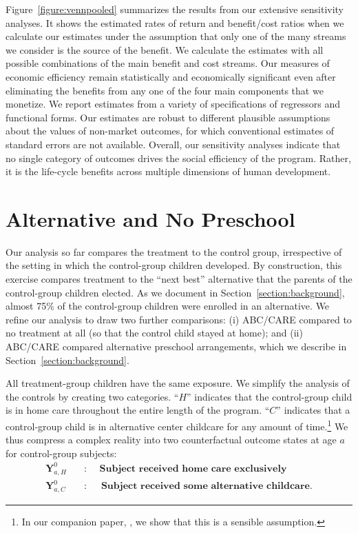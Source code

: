 Figure~\ref{figure:vennpooled} summarizes the results from our extensive sensitivity analyses. It shows the estimated rates of return and benefit/cost ratios when we calculate our estimates under the assumption that only one of the many streams we consider is the source of the benefit. We calculate the estimates with all possible combinations of the main benefit and cost streams. Our measures of economic efficiency remain statistically and economically significant even after eliminating the benefits from any one of the four main components that we monetize. We report estimates from a variety of specifications of regressors and functional forms. Our estimates are robust to different plausible assumptions about the values of non-market outcomes, for which conventional estimates of standard errors are not available. Overall, our sensitivity analyses indicate that no single category of outcomes drives the social efficiency of the program. Rather, it is the life-cycle benefits across multiple dimensions of human development.

\section{Alternative and No Preschool} \label{section:cbaresultscont}

Our analysis so far compares the treatment to the control group, irrespective of the setting in which the control-group children developed. By construction, this exercise compares treatment to the ``next best'' alternative that the parents of the control-group children elected. As we document in Section~\ref{section:background}, almost 75\% of the control-group children were enrolled in an alternative. We refine our analysis to draw two further comparisons: (i) ABC/CARE compared to no treatment at all (so that the control child stayed at home); and (ii) ABC/CARE compared alternative preschool arrangements, which we describe in Section~\ref{section:background}.

All treatment-group children have the same exposure. We simplify the analysis of the controls by creating two categories. ``$H$'' indicates that the control-group child is in home care throughout the entire length of the program. ``$C$'' indicates that a control-group child is in alternative center childcare for any amount of time.\footnote{In our companion paper, \citet{Garcia_Heckman_Ziff_2017_Gender-Diff_UNPUBLISHED}, we show that this is a sensible assumption.} We thus compress a complex reality into two counterfactual outcome states at age $a$ for control-group subjects:
\begin{align*}
\bm{Y}_{a,H}^0 \quad &: \quad \textbf{ Subject received home care exclusively} \\
\bm{Y}_{a,C}^0 \quad &: \quad \textbf{ Subject received some alternative childcare}.
\end{align*}

